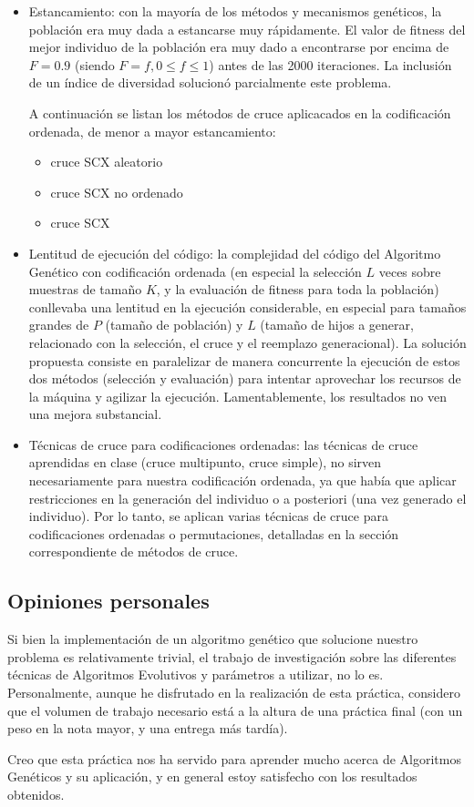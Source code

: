 \documentclass[12pt]{article}
\begin{document}
\begin{itemize}
    \item Estancamiento: con la mayoría de los métodos y mecanismos genéticos, la población era muy dada a estancarse muy rápidamente. El valor de fitness del mejor individuo de la población era muy dado a encontrarse por encima de $F=0.9$ (siendo $F=f, 0\le f\le1$) antes de las 2000 iteraciones. La inclusión de un índice de diversidad solucionó parcialmente este problema.

    A continuación se listan los métodos de cruce aplicacados en la codificación ordenada, de menor a mayor estancamiento:
    \begin{itemize}
        \item cruce SCX aleatorio
        \item cruce SCX no ordenado
        \item cruce SCX
    \end{itemize}
    \item Lentitud de ejecución del código: la complejidad del código del Algoritmo Genético con codificación ordenada (en especial la selección $L$ veces sobre muestras de tamaño $K$, y la evaluación de fitness para toda la población) conllevaba una lentitud en la ejecución considerable, en especial para tamaños grandes de $P$ (tamaño de población) y $L$ (tamaño de hijos a generar, relacionado con la selección, el cruce y el reemplazo generacional). La solución propuesta consiste en paralelizar de manera concurrente la ejecución de estos dos métodos (selección y evaluación) para intentar aprovechar los recursos de la máquina y agilizar la ejecución. Lamentablemente, los resultados no ven una mejora substancial.
    \item Técnicas de cruce para codificaciones ordenadas: las técnicas de cruce aprendidas en clase (cruce multipunto, cruce simple), no sirven necesariamente para nuestra codificación ordenada, ya que había que aplicar restricciones en la generación del individuo o a posteriori (una vez generado el individuo). Por lo tanto, se aplican varias técnicas de cruce para codificaciones ordenadas o permutaciones, detalladas en la sección correspondiente de métodos de cruce.
\end{itemize}

\subsection{Opiniones personales}

Si bien la implementación de un algoritmo genético que solucione nuestro problema es relativamente trivial, el trabajo de investigación sobre las diferentes técnicas de Algoritmos Evolutivos y parámetros a utilizar, no lo es. Personalmente, aunque he disfrutado en la realización de esta práctica, considero que el volumen de trabajo necesario está a la altura de una práctica final (con un peso en la nota mayor, y una entrega más tardía).

Creo que esta práctica nos ha servido para aprender mucho acerca de Algoritmos Genéticos y su aplicación, y en general estoy satisfecho con los resultados obtenidos.
\end{document}
